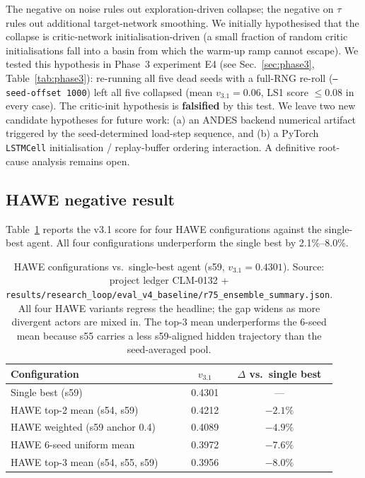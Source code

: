 \documentclass[journal,onecolumn,11pt]{IEEEtran}
\begin{document}
The negative on noise rules out exploration-driven collapse; the
negative on $\tau$ rules out additional target-network smoothing.
We initially hypothesised that the collapse is critic-network
initialisation-driven (a small fraction of random critic
initialisations fall into a basin from which the warm-up ramp
cannot escape). We tested this hypothesis in Phase~3 experiment
E4 (see Sec.~\ref{sec:phase3}, Table~\ref{tab:phase3}): re-running
all five dead seeds with a full-RNG re-roll (\texttt{--seed-offset
1000}) left all five collapsed (mean $v_{3.1} = 0.06$, LS1 score
$\leq 0.08$ in every case). The critic-init hypothesis is
\textbf{falsified} by this test. We leave two new candidate
hypotheses for future work: (a) an ANDES backend numerical artifact
triggered by the seed-determined load-step sequence, and (b) a
PyTorch \texttt{LSTMCell} initialisation / replay-buffer ordering
interaction. A definitive root-cause analysis remains open.

\subsection{HAWE negative result}\label{sec:results-hawe}

Table~\ref{tab:hawe} reports the v3.1 score for four HAWE
configurations against the single-best agent. All four configurations
underperform the single best by 2.1\%--8.0\%.

\begin{table}[!t]
  \centering
  \caption{HAWE configurations vs.\ single-best agent
  (s59, $v_{3.1} = 0.4301$). Source: project ledger CLM-0132 +
  \texttt{results/research\_loop/eval\_v4\_baseline/r75\_ensemble\_summary.json}.
  All four HAWE variants regress the headline; the gap widens as
  more divergent actors are mixed in. The top-3 mean
  underperforms the 6-seed mean because s55 carries a less
  s59-aligned hidden trajectory than the seed-averaged pool.}
  \label{tab:hawe}
  \begin{tabular}{lcc}
    \toprule
    Configuration & $v_{3.1}$ & $\Delta$ vs.\ single best \\
    \midrule
    Single best (s59)                 & 0.4301 & ---      \\
    HAWE top-2 mean (s54, s59)        & 0.4212 & $-2.1\%$ \\
    HAWE weighted (s59 anchor 0.4)    & 0.4089 & $-4.9\%$ \\
    HAWE 6-seed uniform mean          & 0.3972 & $-7.6\%$ \\
    HAWE top-3 mean (s54, s55, s59)   & 0.3956 & $-8.0\%$ \\
    \bottomrule
  \end{tabular}
\end{table}
\end{document}
